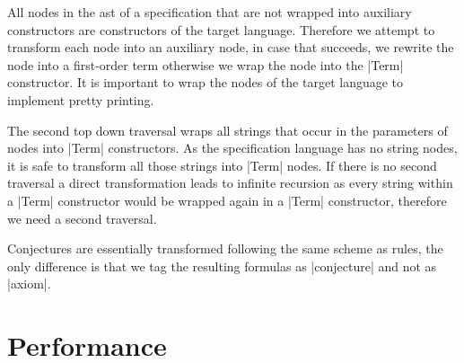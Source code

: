 All nodes in the \gls{ast} of a specification that are not wrapped
into auxiliary constructors are constructors of the target
language. Therefore we attempt to transform each node into an
auxiliary node, in case that succeeds, we rewrite the node into a
first-order term otherwise we wrap the node into the \code|Term|
constructor. It is important to wrap the nodes of the target language
to implement pretty printing.

The second top down traversal wraps all strings that occur in the
parameters of nodes into \code|Term| constructors. As the
specification language has no string nodes, it is safe to transform
all those strings into \code|Term| nodes. If there is no second
traversal a direct transformation leads to infinite recursion as every
string within a \code|Term| constructor would be wrapped again in a
\code|Term| constructor, therefore we need a second traversal.

Conjectures are essentially transformed following the same scheme as
rules, the only difference is that we tag the resulting formulas as
\code|conjecture| and not as \code|axiom|.
\section{Performance}
